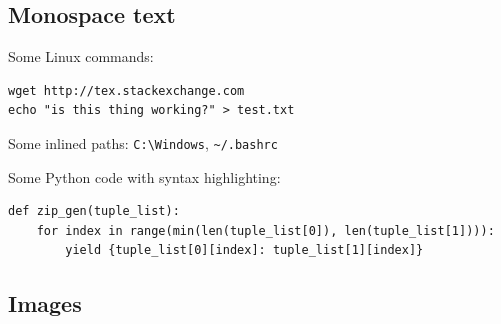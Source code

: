 \subsection{Monospace text}

Some Linux commands:
\begin{lstlisting}
wget http://tex.stackexchange.com
echo "is this thing working?" > test.txt
\end{lstlisting}

Some inlined paths: \lstinline{C:\Windows}, \lstinline{~/.bashrc} %

Some Python code with syntax highlighting:
\begin{verbatim}
def zip_gen(tuple_list):
    for index in range(min(len(tuple_list[0]), len(tuple_list[1]))):
        yield {tuple_list[0][index]: tuple_list[1][index]}
\end{verbatim}

\subsection{Images}

